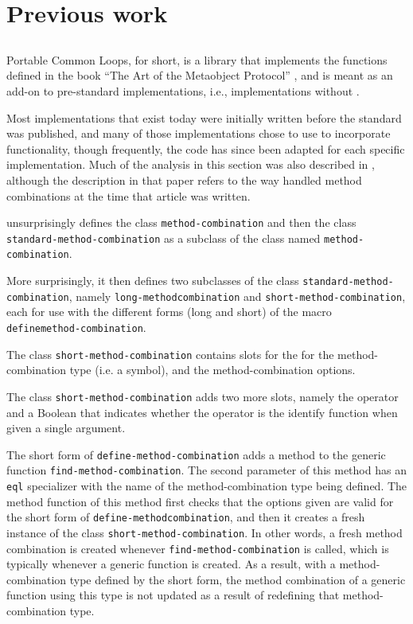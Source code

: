 \section{Previous work}

\subsection{\pcl{}}
\label{sec-pcl}

Portable Common Loops, \pcl{} for short, is a library that implements
the functions defined in the book ``The Art of the Metaobject
Protocol'' \cite{Kiczales:1991:AMP:574212}, and is meant as an add-on
to pre-standard \commonlisp{} implementations, i.e., implementations
without \clos{}.

Most \commonlisp{} implementations that exist today were initially
written before the standard was published, and many of those
implementations chose to use \pcl{} to incorporate \clos{}
functionality, though frequently, the code has since been adapted for
each specific implementation.  Much of the analysis in this section
was also described in \cite{verna.18.els}, although the description in
that paper refers to the way \sbcl{} handled method combinations at
the time that article was written.

\pcl{} unsurprisingly defines the class \texttt{method\--combination}
and then the class \texttt{standard\--method\--combination} as a
subclass of the class named \texttt{method\--combination}.

More surprisingly, it then defines two subclasses of the class
\texttt{standard\--method\--combination}, namely
\texttt{long\--method\-combination} and
\texttt{short\--method\--combination}, each for use with the different
forms (long and short) of the macro
\texttt{define\-method\--combination}.

The class \texttt{short-method-combination} contains slots for the for
the method-combination type (i.e. a symbol), and the
method-combination options.

The class \texttt{short-method-combination} adds two more slots,
namely the operator and a Boolean that indicates whether the operator
is the identify function when given a single argument.

The short form of \texttt{define-method-combination} adds a method to
the generic function \texttt{find-method-combination}.  The second
parameter of this method has an \texttt{eql} specializer with the name
of the method-combination type being defined.  The method function of
this method first checks that the options given are valid for the
short form of \texttt{define-method\-combination}, and then it creates
a fresh instance of the class \texttt{short-method-combination}.  In
other words, a fresh method combination is created whenever
\texttt{find-method-combination} is called, which is typically
whenever a generic function is created.  As a result, with a
method-combination type defined by the short form, the method
combination of a generic function using this type is not updated as a
result of redefining that method-combination type.

